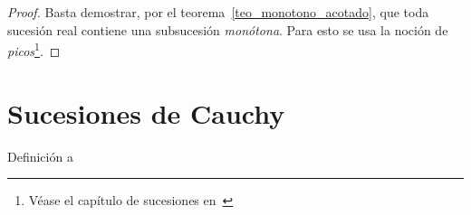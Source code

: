 \begin{proof}
	Basta demostrar, por el teorema~\ref{teo_monotono_acotado}, que toda sucesión real contiene una subsucesión \emph{monótona}.
	Para esto se usa la noción de \emph{picos}\footnote{Véase el capítulo de sucesiones en~\cite{spivak_calculus_2008}}.
\end{proof}

\section{Sucesiones de Cauchy}%
\label{sec:Sucesiones de Cauchy}

\begin{defi}
	Definición a
\end{defi}

